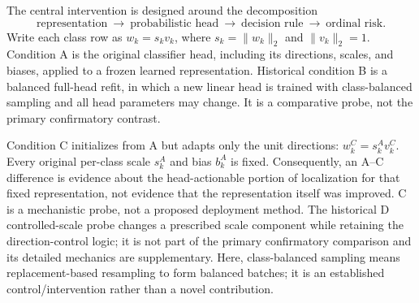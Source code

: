 The central intervention is designed around the decomposition
\[\text{representation}\ \longrightarrow\ \text{probabilistic head}
\ \longrightarrow\ \text{decision rule}\ \longrightarrow\ \text{ordinal risk}.\]
Write each class row as \(w_k=s_kv_k\), where \(s_k=\lVert w_k\rVert_2\) and
\(\lVert v_k\rVert_2=1\). Condition A is the original classifier head,
including its directions, scales, and biases, applied to a frozen learned
representation. Historical condition B is a balanced full-head refit, in which
a new linear head is trained with class-balanced sampling and all head
parameters may change. It is a comparative probe, not the primary
confirmatory contrast.

Condition C initializes from A but adapts only the unit directions:
\(w_k^C=s_k^A v_k^C\). Every original per-class scale \(s_k^A\) and bias
\(b_k^A\) is fixed. Consequently, an A--C difference is evidence about the
head-actionable portion of localization for that fixed representation, not
evidence that the representation itself was improved. C is a mechanistic probe,
not a proposed deployment method. The historical D controlled-scale probe
changes a prescribed scale component while retaining the direction-control
logic; it is not part of the primary confirmatory comparison and its detailed
mechanics are supplementary. Here, class-balanced sampling means
replacement-based resampling to form balanced batches; it is an established
control/intervention rather than a novel contribution.
